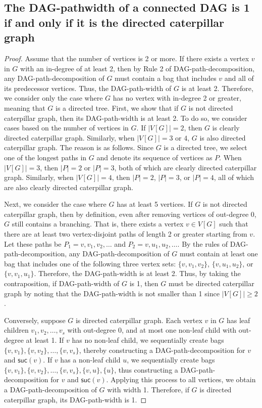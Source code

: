\documentclass[runningheads]{llncs}
\theoremstyle{plain}
\theoremstyle{definition}
\begin{document}
\subsection{The DAG-pathwidth of a connected DAG is 1 if and only if it is the directed caterpillar graph}
\begin{proof}
    Assume that the number of vertices is 2 or more.
    If there exists a vertex $v$ in $G$ with an in-degree of at least 2, then by Rule 2 of DAG-path-decomposition, any DAG-path-decomposition of $G$ must contain a bag that includes $v$ and all of its predecessor vertices. Thus, the DAG-path-width of $G$ is at least 2. Therefore, we consider only the case where $G$ has no vertex with in-degree 2 or greater, meaning that $G$ is a directed tree. First, we show that if $G$ is not directed caterpillar graph, then its DAG-path-width is at least 2. To do so, we consider cases based on the number of vertices in $G$. If $|V[G]| = 2$, then $G$ is clearly directed caterpillar graph. Similarly, when $|V[G]| = 3$ or $4$, $G$ is also directed caterpillar graph. The reason is as follows. Since $G$ is a directed tree, we select one of the longest paths in $G$ and denote its sequence of vertices as $P$. When $|V[G]| = 3$, then $|P| = 2$ or $|P| = 3$, both of which are clearly directed caterpillar graph. Similarly, when $|V[G]| = 4$, then $|P| = 2$, $|P| = 3$, or $|P| = 4$, all of which are also clearly directed caterpillar graph.
    
    Next, we consider the case where $G$ has at least 5 vertices. If $G$ is not directed caterpillar graph, then by definition, even after removing vertices of out-degree 0, $G$ still contains a branching. That is, there exists a vertex $v \in V[G]$ such that there are at least two vertex-disjoint paths of length 2 or greater starting from $v$. Let these paths be $P_1 = v, v_1, v_2, \dots$ and $P_2 = v, u_1, u_2, \dots$. By the rules of DAG-path-decomposition, any DAG-path-decomposition of $G$ must contain at least one bag that includes one of the following three vertex sets: $\{v, v_1, v_2\}$, $\{v, u_1, u_2\}$, or $\{v, v_1, u_1\}$. Therefore, the DAG-path-width is at least 2. Thus, by taking the contraposition, if DAG-path-width of $G$ is 1, then $G$ must be directed caterpillar graph by noting that the DAG-path-width is not smaller than 1 since $|V[G]| \geq 2$.
    
    Conversely, suppose $G$ is directed caterpillar graph. Each vertex $v$ in $G$ has leaf children $v_1, v_2, \dots, v_s$ with out-degree 0, and at most one non-leaf child with out-degree at least 1. If $v$ has no non-leaf child, we sequentially create bags $\{v, v_1\}, \{v, v_2\}, \dots, \{v, v_s\}$, thereby constructing a DAG-path-decomposition for $v$ and $\mathsf{suc}(v)$. If $v$ has a non-leaf child $u$, we sequentially create bags $\{v, v_1\}, \{v, v_2\}, \dots, \{v, v_s\}, \{v, u\}, \{u\}$, thus constructing a DAG-path-decomposition for $v$ and $\mathsf{suc}(v)$. Applying this process to all vertices, we obtain a DAG-path-decomposition of $G$ with width 1. Therefore, if $G$ is directed caterpillar graph, its DAG-path-width is 1.
\end{proof}
\end{document}
